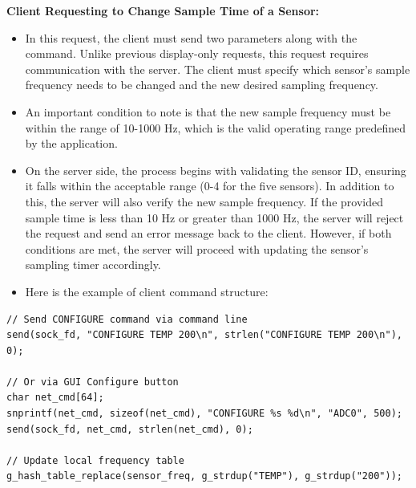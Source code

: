\textbf{Client Requesting to Change Sample Time of a Sensor:}
\begin{itemize}
\item In this request, the client must send two parameters along with the command. Unlike previous display-only requests, this request requires communication with the server. The client must specify which sensor's sample frequency needs to be changed and the new desired sampling frequency.
\item An important condition to note is that the new sample frequency must be within the range of 10-1000 Hz, which is the valid operating range predefined by the application.
\item On the server side, the process begins with validating the sensor ID, ensuring it falls within the acceptable range (0-4 for the five sensors). In addition to this, the server will also verify the new sample frequency. If the provided sample time is less than 10 Hz or greater than 1000 Hz, the server will reject the request and send an error message back to the client. However, if both conditions are met, the server will proceed with updating the sensor's sampling timer accordingly.

\item Here is the example of client command structure:
\end{itemize}

\begin{verbatim}
// Send CONFIGURE command via command line
send(sock_fd, "CONFIGURE TEMP 200\n", strlen("CONFIGURE TEMP 200\n"), 0);

// Or via GUI Configure button
char net_cmd[64];
snprintf(net_cmd, sizeof(net_cmd), "CONFIGURE %s %d\n", "ADC0", 500);
send(sock_fd, net_cmd, strlen(net_cmd), 0);

// Update local frequency table
g_hash_table_replace(sensor_freq, g_strdup("TEMP"), g_strdup("200"));
\end{verbatim}

